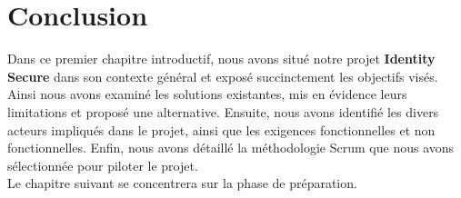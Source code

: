\section*{Conclusion}

Dans ce premier chapitre introductif, nous avons situé notre projet \textbf{Identity Secure} dans son contexte général et exposé succinctement les objectifs visés. Ainsi nous avons examiné les solutions existantes, mis en évidence leurs limitations et proposé une alternative. Ensuite, nous avons identifié les divers acteurs impliqués dans le projet, ainsi que les exigences fonctionnelles et non fonctionnelles. Enfin, nous avons détaillé la méthodologie Scrum que nous avons sélectionnée pour piloter le projet.\\
Le chapitre suivant se concentrera sur la phase de préparation.